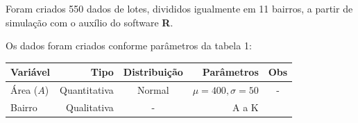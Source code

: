 \documentclass[
  a4paper, 12pt]{article}
\begin{document}
Foram criados 550 dados de lotes, divididos igualmente em 11 bairros, a
partir de simulação com o auxílio do software \textbf{R}.

Os dados foram criados conforme parâmetros da tabela 1:

\begin{longtable}[]{@{}lrcrc@{}}
\toprule
\begin{minipage}[b]{0.18\columnwidth}\raggedright
Variável\strut
\end{minipage} & \begin{minipage}[b]{0.12\columnwidth}\raggedleft
Tipo\strut
\end{minipage} & \begin{minipage}[b]{0.11\columnwidth}\centering
Distribuição\strut
\end{minipage} & \begin{minipage}[b]{0.25\columnwidth}\raggedleft
Parâmetros\strut
\end{minipage} & \begin{minipage}[b]{0.21\columnwidth}\centering
Obs\strut
\end{minipage}\tabularnewline
\midrule
\endhead
\begin{minipage}[t]{0.18\columnwidth}\raggedright
Área (\(A\))\strut
\end{minipage} & \begin{minipage}[t]{0.12\columnwidth}\raggedleft
Quantitativa\strut
\end{minipage} & \begin{minipage}[t]{0.11\columnwidth}\centering
Normal\strut
\end{minipage} & \begin{minipage}[t]{0.25\columnwidth}\raggedleft
\(\mu = 400, \sigma = 50\)\strut
\end{minipage} & \begin{minipage}[t]{0.21\columnwidth}\centering
-\strut
\end{minipage}\tabularnewline
\begin{minipage}[t]{0.18\columnwidth}\raggedright
Bairro\strut
\end{minipage} & \begin{minipage}[t]{0.12\columnwidth}\raggedleft
Qualitativa\strut
\end{minipage} & \begin{minipage}[t]{0.11\columnwidth}\centering
-\strut
\end{minipage} & \begin{minipage}[t]{0.25\columnwidth}\raggedleft
A a K\strut
\end{minipage} & \begin{minipage}[t]{0.21\columnwidth}\centering

\end{minipage}
\end{longtable}
\end{document}

